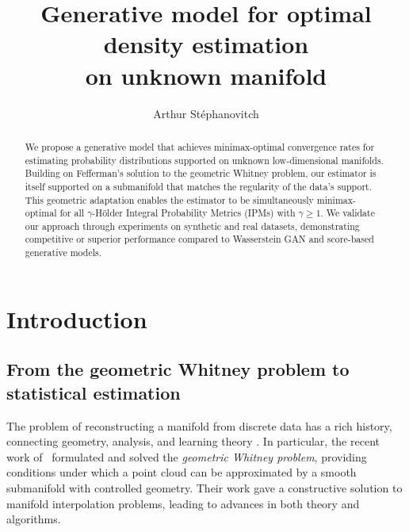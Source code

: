 \documentclass[10pt]{article}
\title{Generative model for optimal  density estimation\\ on unknown manifold}
\author{Arthur St\'ephanovitch}
\affil{\small D\'epartement de Math\'ematiques et Applications\\
       Ecole Normale Sup\'erieure, Université PSL, CNRS\\
       F-75005 Paris, France,\\ \texttt{stephanovitch@dma.ens.fr}}
\date{}
\begin{document}
\maketitle
\begin{abstract}
We propose a generative model that achieves minimax-optimal convergence rates for estimating probability distributions supported on unknown low-dimensional manifolds. Building on Fefferman's solution to the geometric Whitney problem, our estimator is itself supported on a submanifold that matches the regularity of the data's support. This geometric adaptation enables the estimator to be simultaneously minimax-optimal for all \( \gamma \)-Hölder Integral Probability Metrics (IPMs) with \( \gamma \geq 1 \). We validate our approach through experiments on synthetic and real datasets, demonstrating competitive or superior performance compared to Wasserstein GAN and score-based generative models. 
\end{abstract}

\tableofcontents
\section{Introduction}

\subsection{From the geometric Whitney problem to statistical estimation}

The problem of reconstructing a manifold from discrete data has a rich history, connecting geometry, analysis, and learning theory \citep{lassas2001determining,aamari2017nonasymptotic,boissonnat2018delaunay}. In particular, the recent work of~\cite{fefferman2015reconstruction} formulated and solved the \emph{geometric Whitney problem}, providing conditions under which a point cloud can be approximated by a smooth submanifold with controlled geometry. Their work gave a constructive solution to manifold interpolation problems, leading to advances in both theory and algorithms.
\end{document}
